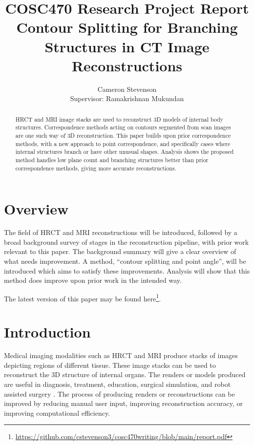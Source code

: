 \documentclass[11p, titlepage]{article}
\title{COSC470 Research Project Report\\
\bigskip
Contour Splitting for Branching Structures in CT Image Reconstructions}
\author{Cameron Stevenson\\[0.5cm]{\small Supervisor: Ramakrishnan Mukundan}}
\begin{document}
\maketitle
\begin{abstract}
HRCT and MRI image stacks are used to reconstruct 3D models of internal body structures. Correspondence methods acting on contours segmented from scan images are one such way of 3D reconstruction. This paper builds upon prior correspondence methods, with a new approach to point correspondence, and specifically cases where internal structures branch or have other unusual shapes. Analysis shows the proposed method handles low plane count and branching structures better than prior correspondence methods, giving more accurate reconstructions.
\end{abstract}
\tableofcontents

\section{Overview}

The field of HRCT and MRI reconstructions will be introduced, followed by a broad background survey of stages in the reconstruction pipeline, with prior work relevant to this paper. The background summary will give a clear overview of what needs improvement. A method, ``contour splitting and point angle'', will be introduced which aims to satisfy these improvements. Analysis will show that this method does improve upon prior work in the intended way.

The latest version of this paper may be found here\footnote{\url{https://github.com/cstevenson3/cosc470writing/blob/main/report.pdf}}.

\pagebreak

\section{Introduction}

Medical imaging modalities such as HRCT and MRI produce stacks of images depicting regions of different tissue. These image stacks can be used to reconstruct the 3D structure of internal organs. The renders or models produced are useful in diagnosis, treatment, education, surgical simulation, and robot assisted surgery \cite{mackay2019robust, mukundan2016reconstruction, pan2017comparison}. The process of producing renders or reconstructions can be improved by reducing manual user input, improving reconstruction accuracy, or improving computational efficiency.
\end{document}
